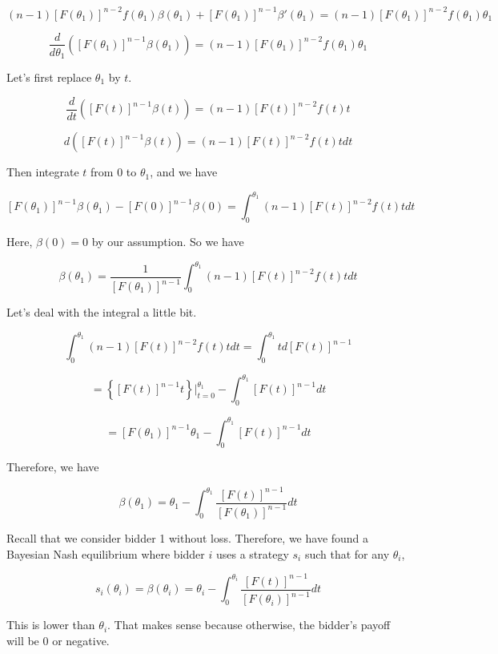 \documentclass[12pt, oneside]{article}
\begin{document}
\[
(n - 1)[F(\theta_1)]^{n-2} f(\theta_1) \beta(\theta_1) + [F(\theta_1)]^{n-1} \beta'(\theta_1) = (n - 1)[F(\theta_1)]^{n-2} f(\theta_1) \theta_1
\]

\[
\frac{d}{d\theta_1} ([F(\theta_1)]^{n-1} \beta(\theta_1)) = (n - 1)[F(\theta_1)]^{n-2} f(\theta_1) \theta_1
\]

Let's first replace \( \theta_1 \) by \( t \).

\[
\frac{d}{dt} ([F(t)]^{n-1} \beta(t)) = (n - 1)[F(t)]^{n-2} f(t) t
\]

\[
d ([F(t)]^{n-1} \beta(t)) = (n - 1)[F(t)]^{n-2} f(t) t dt
\]

Then integrate \( t \) from \( 0 \) to \( \theta_1 \), and we have

\[
[F(\theta_1)]^{n-1} \beta(\theta_1) - [F(0)]^{n-1} \beta(0) = \int_0^{\theta_1} (n - 1)[F(t)]^{n-2} f(t) t dt
\]

Here, \( \beta(0) = 0 \) by our assumption. So we have

\[
\beta(\theta_1) = \frac{1}{[F(\theta_1)]^{n-1}} \int_0^{\theta_1} (n - 1)[F(t)]^{n-2} f(t) t dt
\]

Let's deal with the integral a little bit.

\[
\int_0^{\theta_1} (n - 1)[F(t)]^{n-2} f(t) t dt = \int_0^{\theta_1} t d[F(t)]^{n-1}
\]

\[
= \left\{ [F(t)]^{n-1} t \right\} \bigg|_{t=0}^{\theta_1} - \int_0^{\theta_1} [F(t)]^{n-1} dt
\]

\[
= [F(\theta_1)]^{n-1} \theta_1 - \int_0^{\theta_1} [F(t)]^{n-1} dt
\]

Therefore, we have

\[
\beta(\theta_1) = \theta_1 - \int_0^{\theta_1} \frac{[F(t)]^{n-1}}{[F(\theta_1)]^{n-1}} dt
\]

Recall that we consider bidder 1 without loss. Therefore, we have found a Bayesian Nash equilibrium where bidder \( i \) uses a strategy \( s_i \) such that for any \( \theta_i \),

\[
s_i(\theta_i) = \beta(\theta_i) = \theta_i - \int_0^{\theta_i} \frac{[F(t)]^{n-1}}{[F(\theta_i)]^{n-1}} dt
\]

This is lower than \( \theta_i \). That makes sense because otherwise, the bidder's payoff will be 0 or negative.
\end{document}
